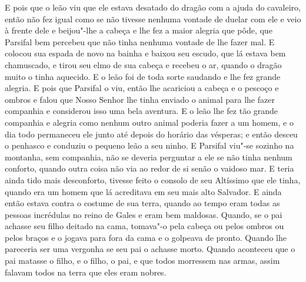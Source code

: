 E pois que o leão viu que ele estava desatado do dragão com a ajuda do
cavaleiro, então não fez igual como se não tivesse nenhuma vontade de duelar
com ele e veio à frente dele e beijou"-lhe a cabeça e lhe fez a maior alegria
que pôde, que Parsifal bem percebeu que não tinha nenhuma vontade de lhe fazer
mal. E colocou sua espada de novo na bainha e baixou seu escudo, que lá estava
bem chamuscado, e tirou seu elmo de sua cabeça e recebeu o ar, quando o dragão
muito o tinha aquecido. E o leão foi de toda sorte saudando e lhe fez grande
alegria. E pois que Parsifal o viu, então lhe acariciou a cabeça e o pescoço e
ombros e falou que Nosso Senhor lhe tinha enviado o animal para lhe fazer
companhia e considerou isso uma bela aventura. E o leão lhe fez tão grande
companhia e alegria como nenhum outro animal poderia fazer a um homem, e o dia
todo permaneceu ele junto até depois do horário das vésperas; e então desceu o
penhasco e conduziu o pequeno leão a seu ninho. E Parsifal viu"-se sozinho na
montanha, sem companhia, não se deveria perguntar a ele se não tinha nenhum
conforto, quando outra coisa não via ao redor de si senão o vaidoso mar. E
teria ainda tido mais desconforto, tivesse feito o consolo de seu Altíssimo que
ele tinha, quando era um homem que lá acreditava em seu mais alto Salvador. E
ainda então estava contra o costume de sua terra, quando ao tempo eram todas as
pessoas incrédulas no reino de Gales e eram bem maldosas. Quando, se o pai
achasse seu filho deitado na cama, tomava"-o pela cabeça ou pelos ombros ou
pelos braços e o jogava para fora da cama e o golpeava de pronto. Quando lhe
pareceria ser uma vergonha se seu pai o achasse morto. Quando aconteceu que o
pai matasse o filho, e o filho, o pai, e que todos morressem nas armas, assim
falavam todos na terra que eles eram nobres. 

